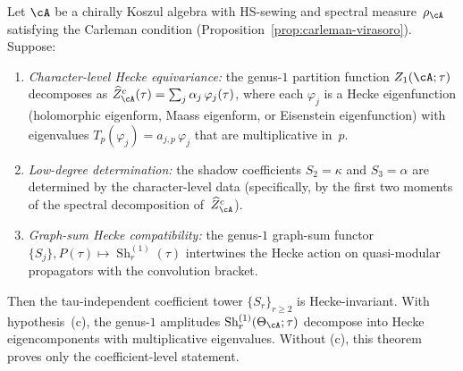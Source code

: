 \begin{theorem}%
\label{thm:route-c-propagation}%
%
Let $\cA$ be a chirally Koszul algebra with HS-sewing and
spectral measure~$\rho_\cA$ satisfying the Carleman condition
\textup{(}Proposition~\textup{\ref{prop:carleman-virasoro}}\textup{)}.
Suppose:
\begin{enumerate}[label=\textup{(\alph*)}]
\item \emph{Character-level Hecke equivariance:}
 the genus-$1$ partition function
 $Z_1(\cA;\tau)$ decomposes as
 $\widehat{Z}^c_\cA(\tau) = \sum_j \alpha_j\,\varphi_j(\tau)$,
 where each $\varphi_j$ is a Hecke eigenfunction
 \textup{(}holomorphic eigenform, Maass eigenform, or
 Eisenstein eigenfunction\textup{)} with eigenvalues
 $T_p(\varphi_j) = a_{j,p}\,\varphi_j$ that are multiplicative
 in~$p$.

\item \emph{Low-degree determination:}
 the shadow coefficients $S_2 = \kappa$ and $S_3 = \alpha$
 are determined by the character-level data
 \textup{(}specifically, by the first two moments of the
 spectral decomposition of~$\widehat{Z}^c_\cA$\textup{)}.
\item \emph{Graph-sum Hecke compatibility:}
 the genus-$1$ graph-sum functor
 $\{S_j\},P(\tau)\mapsto\operatorname{Sh}_r^{(1)}(\tau)$
 intertwines the Hecke action on quasi-modular propagators with the
 convolution bracket.
\end{enumerate}
Then the tau-independent coefficient tower $\{S_r\}_{r\ge2}$ is
Hecke-invariant. With hypothesis~\textup{(c)}, the genus-$1$
amplitudes $\operatorname{Sh}_r^{(1)}(\Theta_\cA;\tau)$ decompose
into Hecke eigencomponents with multiplicative eigenvalues. Without
\textup{(c)}, this theorem proves only the coefficient-level
statement.
\end{theorem}

